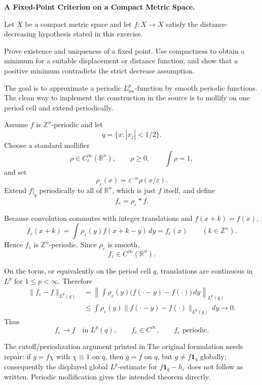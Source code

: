\begin{problem}[CP-II-0266]
\label{prob:cp-ii-0266}
\textbf{A Fixed-Point Criterion on a Compact Metric Space.}

\hspace*{1.5em}Let \(X\) be a compact metric space and let \(f:X\to X\) satisfy the
distance-decreasing hypothesis stated in this exercise.

Prove existence and uniqueness of a fixed point. Use compactness to obtain a
minimum for a suitable displacement or distance function, and show that a
positive minimum contradicts the strict decrease assumption.
\end{problem}

\begin{solution}
The goal is to approximate a periodic \(L^p_{\mathrm{loc}}\)-function by smooth periodic
functions. The clean way to implement the construction in the source is to mollify on one
period cell and extend periodically.

Assume \(f\) is \(\mathbb Z^n\)-periodic and let
\[
q=\{x:|x_j|<1/2\}.
\]
Choose a standard mollifier
\[
\rho\in C_c^\infty(\mathbb R^n),
\qquad
\rho\ge0,
\qquad
\int\rho=1,
\]
and set
\[
\rho_\varepsilon(x)=\varepsilon^{-n}\rho(x/\varepsilon).
\]
Extend \(f|_q\) periodically to all of \(\mathbb R^n\), which is just \(f\) itself, and define
\[
f_\varepsilon=\rho_\varepsilon*f.
\]

Because convolution commutes with integer translations and \(f(x+k)=f(x)\),
\[
f_\varepsilon(x+k)
=
\int\rho_\varepsilon(y)f(x+k-y)\,dy
=
f_\varepsilon(x)
\qquad(k\in\mathbb Z^n).
\]
Hence \(f_\varepsilon\) is \(\mathbb Z^n\)-periodic. Since \(\rho_\varepsilon\) is smooth,
\[
\boxed{f_\varepsilon\in C^\infty(\mathbb R^n).}
\]

On the torus, or equivalently on the period cell \(q\),
translations are continuous in \(L^p\) for \(1\le p<\infty\). Therefore
\[
\begin{aligned}
\|f_\varepsilon-f\|_{L^p(q)}
&=
\left\|
\int\rho_\varepsilon(y)\bigl(f(\cdot-y)-f(\cdot)\bigr)\,dy
\right\|_{L^p(q)}\\
&\le
\int\rho_\varepsilon(y)
\|f(\cdot-y)-f(\cdot)\|_{L^p(q)}\,dy
\longrightarrow0.
\end{aligned}
\]
Thus
\[
\boxed{
f_\varepsilon\to f
\quad\text{in }L^p(q),
\qquad
f_\varepsilon\in C^\infty,
\qquad
f_\varepsilon\text{ periodic}.
}
\]

The cutoff/periodization argument printed in The original formulation needs repair: if
\(g=f\chi\) with \(\chi\equiv1\) on \(q\), then \(g=f\) on \(q\), but \(g\neq f\mathbf1_q\)
globally; consequently the displayed global \(L^p\)-estimate for
\(f\mathbf1_q-h_\varepsilon\) does not follow as written. Periodic mollification gives the
intended theorem directly.
\end{solution}


